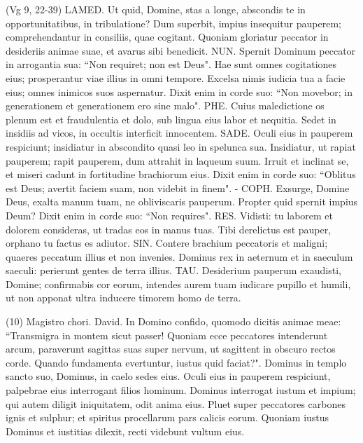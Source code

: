 \begin{biblechapter}  (Vg 9, 22-39) 
\verse LAMED. Ut quid, Domine, stas a longe, abscondis te in opportunitatibus, in tribulatione? 
\verse Dum superbit, impius insequitur pauperem; comprehendantur in consiliis, quae cogitant. 
\verse Quoniam gloriatur peccator in desideriis animae suae, et avarus sibi benedicit. 
\verse NUN. Spernit Dominum peccator in arrogantia sua: “Non requiret; non est Deus". 
\verse Hae sunt omnes cogitationes eius; prosperantur viae illius in omni tempore. Excelsa nimis iudicia tua a facie eius; omnes inimicos suos aspernatur. 
\verse Dixit enim in corde suo: “Non movebor; in generationem et generationem ero sine malo". 
\verse PHE. Cuius maledictione os plenum est et fraudulentia et dolo, sub lingua eius labor et nequitia. 
\verse Sedet in insidiis ad vicos, in occultis interficit innocentem. 
\verse SADE. Oculi eius in pauperem respiciunt; insidiatur in abscondito quasi leo in spelunca sua. Insidiatur, ut rapiat pauperem; rapit pauperem, dum attrahit in laqueum suum. 
\verse Irruit et inclinat se, et miseri cadunt in fortitudine brachiorum eius. 
\verse Dixit enim in corde suo: “Oblitus est Deus; avertit faciem suam, non videbit in finem". - 
\verse COPH. Exsurge, Domine Deus, exalta manum tuam, ne obliviscaris pauperum. 
\verse Propter quid spernit impius Deum? Dixit enim in corde suo: “Non requires". 
\verse RES. Vidisti: tu laborem et dolorem consideras, ut tradas eos in manus tuas. Tibi derelictus est pauper, orphano tu factus es adiutor. 
\verse SIN. Contere brachium peccatoris et maligni; quaeres peccatum illius et non invenies. 
\verse Dominus rex in aeternum et in saeculum saeculi: perierunt gentes de terra illius. 
\verse TAU. Desiderium pauperum exaudisti, Domine; confirmabis cor eorum, intendes aurem tuam 
\verse iudicare pupillo et humili, ut non apponat ultra inducere timorem homo de terra. 
\end{biblechapter}

\begin{biblechapter}  (10) 
\verse  Magistro chori. David. In Domino confido, quomodo dicitis animae meae: “Transmigra in montem sicut passer! 
\verse Quoniam ecce peccatores intenderunt arcum, paraverunt sagittas suas super nervum, ut sagittent in obscuro rectos corde. 
\verse Quando fundamenta evertuntur, iustus quid faciat?". 
\verse Dominus in templo sancto suo, Dominus, in caelo sedes eius. Oculi eius in pauperem respiciunt, palpebrae eius interrogant filios hominum. 
\verse Dominus interrogat iustum et impium; qui autem diligit iniquitatem, odit anima eius. 
\verse Pluet super peccatores carbones ignis et sulphur; et spiritus procellarum pars calicis eorum. 
\verse Quoniam iustus Dominus et iustitias dilexit, recti videbunt vultum eius. 
\end{biblechapter}

